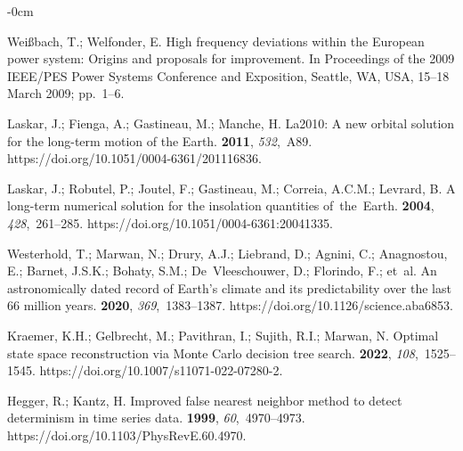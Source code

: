 \documentclass[entropy,article,accept,pdftex,moreauthors]{Definitions/mdpi}
\begin{document}
\begin{adjustwidth}{-\extralength}{0cm}
\begin{thebibliography}{999}
Wei{\ss}bach, T.; Welfonder, E.
\newblock High frequency deviations within the European power system: Origins
  and proposals for improvement.
\newblock In Proceedings of the 2009 IEEE/PES Power Systems Conference and
  Exposition, Seattle, WA, USA, 15--18 March 2009; pp.~1--6.

{Laskar, J.}; {Fienga, A}.; {Gastineau, M}.; {Manche, H}.
\newblock La2010: A new orbital solution for the long-term motion of the Earth.
 {\bf 2011}, {\em 532},~A89.
\newblock
  {https://doi.org/10.1051/0004-6361/201116836}.

{Laskar, J.}; {Robutel, P}.; {Joutel, F}.; {Gastineau, M.}; {Correia, A.C.M.}; {Levrard, B}.
\newblock A long-term numerical solution for the insolation quantities
  of~the~Earth.
 {\bf 2004}, {\em 428},~261--285.
\newblock
  {https://doi.org/10.1051/0004-6361:20041335}.

Westerhold, T.; Marwan, N.; Drury, A.J.; Liebrand, D.; Agnini, C.; Anagnostou,
  E.; Barnet, J.S.K.; Bohaty, S.M.; De~Vleeschouwer, D.; Florindo, F.;  et~al.
\newblock An astronomically dated record of Earth{\textquoteright}s climate and
  its predictability over the last 66 million years.
 {\bf 2020}, {\em 369},~1383--1387.
\newblock
  {https://doi.org/10.1126/science.aba6853}.

Kraemer, K.H.; Gelbrecht, M.; Pavithran, I.; Sujith, R.I.; Marwan, N.
\newblock Optimal state space reconstruction via Monte Carlo decision tree
  search.
 {\bf 2022}, {\em 108},~1525--1545.
\newblock
  {https://doi.org/10.1007/s11071-022-07280-2}.

Hegger, R.; Kantz, H.
\newblock Improved false nearest neighbor method to detect determinism in time
  series data.
 {\bf 1999}, {\em 60},~4970--4973.
\newblock
  {https://doi.org/10.1103/PhysRevE.60.4970}.


\end{thebibliography}
\end{adjustwidth}
\end{document}
